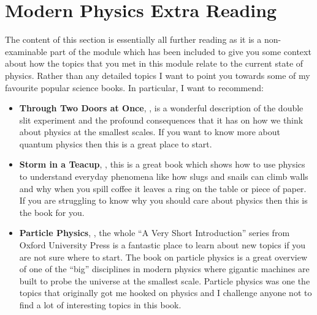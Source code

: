 \documentclass[a4paper,12pt]{book}
\begin{document}
\section{Modern Physics Extra Reading}
The content of this section is essentially all further reading as it is a non-examinable part of the module which has been included to give you some context about how the topics that you met in this module relate to the current state of physics. Rather than any detailed topics I want to point you towards some of my favourite popular science books. In particular, I want to recommend:

\begin{itemize}
\setlength{\itemsep}{-5pt}
    \item \textbf{Through Two Doors at Once}, \citep{ananthaswamy2020through}, is a wonderful description of the double slit experiment and the profound consequences that it has on how we think about physics at the smallest scales. If you want to know more about quantum physics then this is a great place to start.
    
\item \textbf{Storm in a Teacup}, \citep{czerski2016storm}, this is a great book which shows how to use physics to understand everyday phenomena like how slugs and snails can climb walls and why when you spill coffee it leaves a ring on the table or piece of paper. If you are struggling to know why you should care about physics then this is the book for you. 

\item \textbf{Particle Physics},  \citep{close2023particle}, the whole ``A Very Short Introduction'' series from Oxford University Press is a fantastic place to learn about new topics if you are not sure where to start. The book on particle physics is a great overview of one of the ``big'' disciplines in modern physics where gigantic machines are built to probe the universe at the smallest scale. Particle physics was one the topics that originally got me hooked on physics and I challenge anyone not to find a lot of interesting topics in this book.
\end{itemize}  
\end{document}
